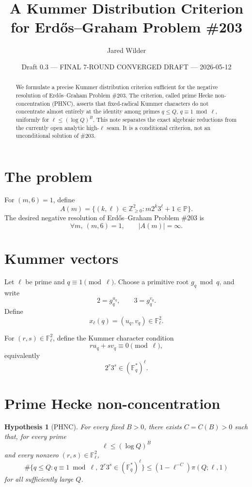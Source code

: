 \documentclass[11pt]{article}
\title{A Kummer Distribution Criterion for Erd\H{o}s--Graham Problem \#203}
\author{Jared Wilder}
\date{Draft 0.3 --- FINAL 7-ROUND CONVERGED DRAFT --- 2026-05-12}
\newtheorem{hypothesis}{Hypothesis}
\newcommand{\Z}{\mathbb Z}
\newcommand{\F}{\mathbb F}
\newcommand{\1}{\mathbf 1}
\begin{document}
\maketitle

\begin{abstract}
We formulate a precise Kummer distribution criterion sufficient for the negative resolution of Erd\H{o}s--Graham Problem \#203.  The criterion, called prime Hecke non-concentration (PHNC), asserts that fixed-radical Kummer characters do not concentrate almost entirely at the identity among primes \(q\le Q\), \(q\equiv1\bmod\ell\), uniformly for \(\ell\le(\log Q)^B\).  This note separates the exact algebraic reductions from the currently open analytic high-\(\ell\) seam.  It is a conditional criterion, not an unconditional solution of \#203.
\end{abstract}

\section{The problem}

For \((m,6)=1\), define
\[
A(m)=\{(k,\ell)\in\Z_{\ge0}^2:m2^k3^\ell+1\in\mathbb P\}.
\]
The desired negative resolution of Erd\H{o}s--Graham Problem \#203 is
\[
\forall m,\ (m,6)=1,\qquad |A(m)|=\infty.
\]

\section{Kummer vectors}

Let \(\ell\) be prime and \(q\equiv1\pmod\ell\).  Choose a primitive root \(g_q\bmod q\), and write
\[
2=g_q^{u_q},\qquad 3=g_q^{v_q}.
\]
Define
\[
x_\ell(q)=(u_q,v_q)\in\F_\ell^2.
\]

For \((r,s)\in\F_\ell^2\), define the Kummer character condition
\[
r u_q+s v_q\equiv0\pmod\ell,
\]
equivalently
\[
2^r3^s\in(\F_q^*)^\ell.
\]

\section{Prime Hecke non-concentration}

\begin{hypothesis}[PHNC]\label{H:phnc}
For every fixed \(B>0\), there exists \(C=C(B)>0\) such that, for every prime
\[
\ell\le(\log Q)^B
\]
and every nonzero \((r,s)\in\F_\ell^2\),
\[
\#\{q\le Q:q\equiv1\bmod\ell,\ 2^r3^s\in(\F_q^*)^\ell\}
\le
(1-\ell^{-C})\pi(Q;\ell,1)
\]
for all sufficiently large \(Q\).
\end{hypothesis}
\end{document}
